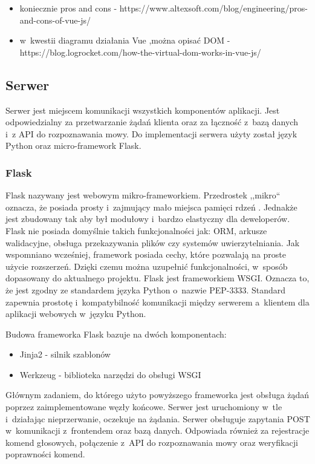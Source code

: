 \begin{itemize}
\item koniecznie pros and cons - https://www.altexsoft.com/blog/engineering/pros-and-cons-of-vue-js/
\item w~kwestii diagramu działania Vue ,można opisać DOM - https://blog.logrocket.com/how-the-virtual-dom-works-in-vue-js/
\end{itemize}

\subsection{Serwer}
Serwer jest miejscem komunikacji wszystkich komponentów aplikacji. Jest odpowiedzialny za przetwarzanie żądań klienta oraz za łączność z~bazą danych i~z API do rozpoznawania mowy. Do implementacji serwera użyty został język Python oraz micro-framework Flask. 

\subsubsection{Flask}
Flask nazywany jest webowym mikro-frameworkiem. Przedrostek ,,mikro`` oznacza, że posiada prosty i~zajmujący mało miejsca pamięci rdzeń \cite{flaskdoc}. Jednakże jest zbudowany tak aby był modułowy i~bardzo elastyczny dla deweloperów. Flask nie posiada domyślnie takich funkcjonalności jak: ORM, arkusze walidacyjne, obsługa przekazywania plików czy systemów uwierzytelniania. Jak wspomniano wcześniej, framework posiada cechy, które pozwalają na proste użycie rozszerzeń. Dzięki czemu można uzupełnić funkcjonalności, w~sposób dopasowany do aktualnego projektu.
Flask jest frameworkiem WSGI. Oznacza to, że jest zgodny ze standardem języka Python o~nazwie PEP-3333. Standard zapewnia prostotę i~kompatybilność komunikacji między serwerem a~klientem dla aplikacji webowych w~języku Python\cite{pep3333}.

Budowa frameworka Flask bazuje na dwóch komponentach\cite{flaskdoc}:
\begin{itemize}
\item Jinja2 - silnik szablonów 
\item Werkzeug - biblioteka narzędzi do obsługi WSGI
\end{itemize}

Głównym zadaniem, do którego użyto powyższego frameworka jest obsługa żądań poprzez zaimplementowane węzły końcowe. Serwer jest uruchomiony w~tle i~działając nieprzerwanie, oczekuje na żądania. Serwer obsługuje zapytania POST w~komunikacji z~frontendem oraz bazą danych. Odpowiada również za rejestracje komend głosowych, połączenie z~API do rozpoznawania mowy oraz weryfikacji poprawności komend.

